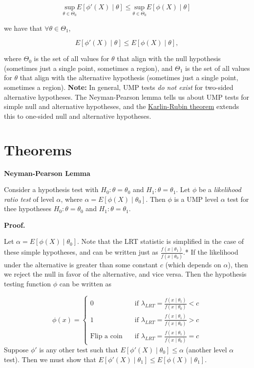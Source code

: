 \documentclass[
  letterpaper,
  DIV=11,
  numbers=noendperiod]{scrreprt}
\begin{document}
\[
\underset{\theta \in \Theta_0}{\text{sup}} E[\phi'(X) \mid \theta] \leq \underset{\theta \in \Theta_0}{\text{sup}} E[\phi(X) \mid \theta]
\]

we have that \(\forall \theta \in \Theta_1\),

\[
E[\phi'(X) \mid \theta] \leq E[\phi(X) \mid \theta],
\]

where \(\Theta_0\) is the set of all values for \(\theta\) that align
with the null hypothesis (sometimes just a single point, sometimes a
region), and \(\Theta_1\) is the set of all values for \(\theta\) that
align with the alternative hypothesis (sometimes just a single point,
sometimes a region). \textbf{Note:} In general, UMP tests \emph{do not
exist} for two-sided alternative hypotheses. The Neyman-Pearson lemma
tells us about UMP tests for simple null and alternative hypotheses, and
the
\href{https://en.wikipedia.org/wiki/Uniformly_most_powerful_test}{Karlin-Rubin
theorem} extends this to one-sided null and alternative hypotheses.

\section{Theorems}\label{theorems-6}

\textbf{Neyman-Pearson Lemma}

Consider a hypothesis test with \(H_0: \theta = \theta_0\) and
\(H_1: \theta = \theta_1\). Let \(\phi\) be a \emph{likelihood ratio
test} of level \(\alpha\), where \(\alpha = E[\phi(X) \mid \theta_0]\).
Then \(\phi\) is a UMP level \(\alpha\) test for thee hypotheses
\(H_0: \theta = \theta_0\) and \(H_1: \theta = \theta_1\).

\textbf{Proof.}

Let \(\alpha = E[\phi(X) \mid \theta_0]\). Note that the LRT statistic
is simplified in the case of these simple hypotheses, and can be written
just as \(\frac{f(x \mid \theta_1)}{f(x \mid \theta_0)}\).* If the
likelihood under the alternative is greater than some constant \(c\)
(which depends on \(\alpha\)), then we reject the null in favor of the
alternative, and vice versa. Then the hypothesis testing function
\(\phi\) can be written as

\[
\phi(x) = \begin{cases} 0 & \quad \text{if } \lambda_{LRT} = \frac{f(x \mid \theta_1)}{f(x \mid \theta_0)} < c\\
1 & \quad \text{if } \lambda_{LRT} = \frac{f(x \mid \theta_1)}{f(x \mid \theta_0)} > c\\
\text{Flip a coin} & \quad \text{if } \lambda_{LRT} = \frac{f(x \mid \theta_1)}{f(x \mid \theta_0)} = c
\end{cases}
\]Suppose \(\phi'\) is any other test such that
\(E[\phi'(X) \mid \theta_0] \leq \alpha\) (another level \(\alpha\)
test). Then we must show that
\(E[\phi'(X) \mid \theta_1] \leq E[\phi(X) \mid \theta_1]\).
\end{document}
